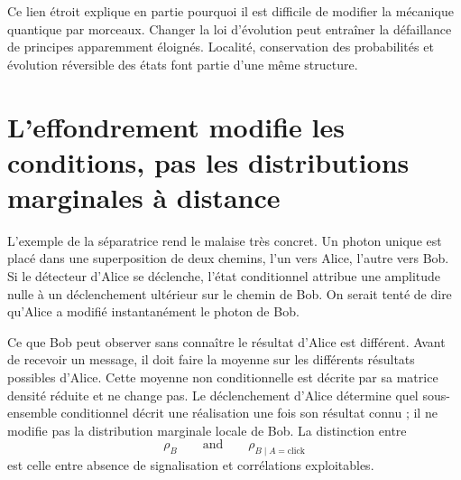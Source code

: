 Ce lien étroit explique en partie pourquoi il est difficile de modifier la mécanique quantique par morceaux. Changer la loi d’évolution peut entraîner la défaillance de principes apparemment éloignés. Localité, conservation des probabilités et évolution réversible des états font partie d’une même structure.

\begin{classroomqa}
\end{classroomqa}

\section{L’effondrement modifie les conditions, pas les distributions marginales à distance}

L’exemple de la séparatrice rend le malaise très concret. Un photon unique est placé dans une superposition de deux chemins, l’un vers Alice, l’autre vers Bob. Si le détecteur d’Alice se déclenche, l’état conditionnel attribue une amplitude nulle à un déclenchement ultérieur sur le chemin de Bob. On serait tenté de dire qu’Alice a modifié instantanément le photon de Bob.

Ce que Bob peut observer sans connaître le résultat d’Alice est différent. Avant de recevoir un message, il doit faire la moyenne sur les différents résultats possibles d’Alice. Cette moyenne non conditionnelle est décrite par sa matrice densité réduite et ne change pas. Le déclenchement d’Alice détermine quel sous-ensemble conditionnel décrit une réalisation une fois son résultat connu ; il ne modifie pas la distribution marginale locale de Bob. La distinction entre
\begin{equation}
\rho_B
\qquad\text{and}\qquad
\rho_{B\mid A=\text{click}}
\end{equation}
est celle entre absence de signalisation et corrélations exploitables.

\begin{classroomqa}
\end{classroomqa}

